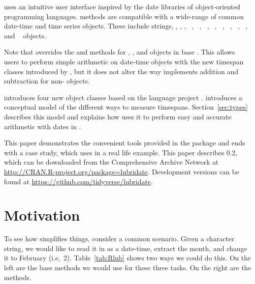 \documentclass[article]{jss}
\begin{document}
 uses an intuitive user interface inspired by the date libraries of object-oriented programming languages.   methods are compatible with a wide-range of common date-time and time series objects. These include  strings, , , ,  ~\citep{chron},  ~\citep{timeDate},  ~\citep{zoo},  ~\citep{xts},  ~\citep{its},  ~\citep{tis},  ~\citep{timeSeries},  ~\citep{fts}, and  ~\citep{tseries} objects.

Note that  overrides the \code{+} and \code{-} methods for , , and  objects in base . This allows users to perform simple arithmetic on date-time objects with the new timespan classes introduced by , but it does not alter the way  implements addition and subtraction for non- objects.

 introduces four new object classes based on the  language  project \citep{jodatime}.  introduces a conceptual model of the different ways to measure timespans. Section~\ref{sec:types} describes this model and explains how  uses it to perform easy and accurate arithmetic with dates in .



This paper demonstrates the convenient tools provided in the  package and ends with a case study, which uses  in a real life example. This paper describes  0.2, which can be downloaded from the Comprehensive  Archive Network at \url{http://CRAN.R-project.org/package=lubridate}. Development versions can be found at \url{https://github.com/tidyverse/lubridate}.

\section{Motivation}

To see how  simplifies things, consider a common scenario. Given a character string, we would like to read it in as a date-time, extract the month, and change it to February (i.e,~2). Table~\ref{tab:Rlub} shows two ways we could do this. On the left are the base  methods we would use for these three tasks.  On the right are the  methods.
\end{document}
